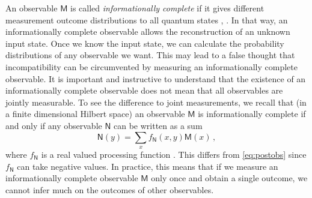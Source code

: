 \documentclass[12pt]{article}
\theoremstyle{definition}
\newcommand{\Mo}{\mathsf{M}}%
\newcommand{\No}{\mathsf{N}}%
\begin{document}
An observable $\Mo$ is called \emph{informationally complete} if it gives different measurement outcome distributions to all quantum states \cite{Prugovecki77}, \cite{BuLa89}. 
In that way, an informationally complete observable allows the reconstruction of an unknown input state. 
Once we know the input state, we can calculate the probability distributions of any observable we want.
This may lead to a false thought that incompatibility can be circumvented by measuring an informationally complete observable.
It is important and instructive to understand that the existence of an informationally complete observable does not mean that all observables are jointly measurable.
To see the difference to joint measurements, we recall that (in a finite dimensional Hilbert space) an observable $\Mo$ is informationally complete if and only if any observable $\No$ can be written as a sum
\begin{equation}
\No(y) = \sum_x f_\No(x,y) \Mo(x) \, ,
\end{equation}
where $f_\No$ is a real valued processing function \cite{DaPeSa04}. 
This differs from \eqref{eq:postobs} since $f_\No$ can take negative values.
In practice, this means that if we measure an informationally complete observable $\Mo$ only once and obtain a single outcome, we cannot infer much on the outcomes of other observables.
\end{document}
